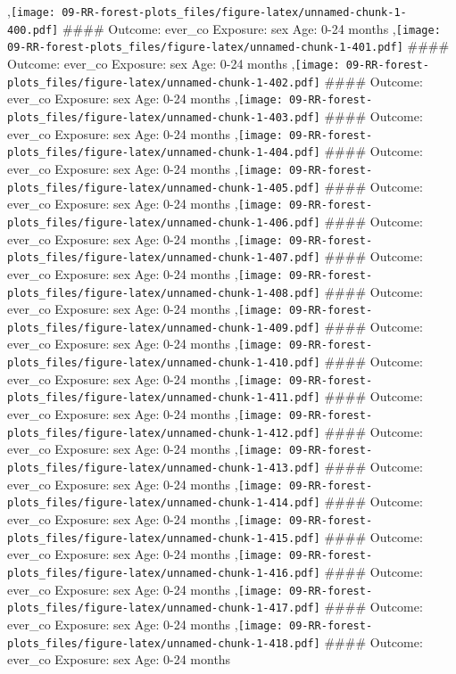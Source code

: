 \documentclass[
  9pt,
]{book}
\begin{document}
,\texttt{[image: 09-RR-forest-plots\_files/figure-latex/unnamed-chunk-1-400.pdf]}
\#\#\#\# Outcome: ever\_co Exposure: sex Age: 0-24 months
,\texttt{[image: 09-RR-forest-plots\_files/figure-latex/unnamed-chunk-1-401.pdf]}
\#\#\#\# Outcome: ever\_co Exposure: sex Age: 0-24 months
,\texttt{[image: 09-RR-forest-plots\_files/figure-latex/unnamed-chunk-1-402.pdf]}
\#\#\#\# Outcome: ever\_co Exposure: sex Age: 0-24 months
,\texttt{[image: 09-RR-forest-plots\_files/figure-latex/unnamed-chunk-1-403.pdf]}
\#\#\#\# Outcome: ever\_co Exposure: sex Age: 0-24 months
,\texttt{[image: 09-RR-forest-plots\_files/figure-latex/unnamed-chunk-1-404.pdf]}
\#\#\#\# Outcome: ever\_co Exposure: sex Age: 0-24 months
,\texttt{[image: 09-RR-forest-plots\_files/figure-latex/unnamed-chunk-1-405.pdf]}
\#\#\#\# Outcome: ever\_co Exposure: sex Age: 0-24 months
,\texttt{[image: 09-RR-forest-plots\_files/figure-latex/unnamed-chunk-1-406.pdf]}
\#\#\#\# Outcome: ever\_co Exposure: sex Age: 0-24 months
,\texttt{[image: 09-RR-forest-plots\_files/figure-latex/unnamed-chunk-1-407.pdf]}
\#\#\#\# Outcome: ever\_co Exposure: sex Age: 0-24 months
,\texttt{[image: 09-RR-forest-plots\_files/figure-latex/unnamed-chunk-1-408.pdf]}
\#\#\#\# Outcome: ever\_co Exposure: sex Age: 0-24 months
,\texttt{[image: 09-RR-forest-plots\_files/figure-latex/unnamed-chunk-1-409.pdf]}
\#\#\#\# Outcome: ever\_co Exposure: sex Age: 0-24 months
,\texttt{[image: 09-RR-forest-plots\_files/figure-latex/unnamed-chunk-1-410.pdf]}
\#\#\#\# Outcome: ever\_co Exposure: sex Age: 0-24 months
,\texttt{[image: 09-RR-forest-plots\_files/figure-latex/unnamed-chunk-1-411.pdf]}
\#\#\#\# Outcome: ever\_co Exposure: sex Age: 0-24 months
,\texttt{[image: 09-RR-forest-plots\_files/figure-latex/unnamed-chunk-1-412.pdf]}
\#\#\#\# Outcome: ever\_co Exposure: sex Age: 0-24 months
,\texttt{[image: 09-RR-forest-plots\_files/figure-latex/unnamed-chunk-1-413.pdf]}
\#\#\#\# Outcome: ever\_co Exposure: sex Age: 0-24 months
,\texttt{[image: 09-RR-forest-plots\_files/figure-latex/unnamed-chunk-1-414.pdf]}
\#\#\#\# Outcome: ever\_co Exposure: sex Age: 0-24 months
,\texttt{[image: 09-RR-forest-plots\_files/figure-latex/unnamed-chunk-1-415.pdf]}
\#\#\#\# Outcome: ever\_co Exposure: sex Age: 0-24 months
,\texttt{[image: 09-RR-forest-plots\_files/figure-latex/unnamed-chunk-1-416.pdf]}
\#\#\#\# Outcome: ever\_co Exposure: sex Age: 0-24 months
,\texttt{[image: 09-RR-forest-plots\_files/figure-latex/unnamed-chunk-1-417.pdf]}
\#\#\#\# Outcome: ever\_co Exposure: sex Age: 0-24 months
,\texttt{[image: 09-RR-forest-plots\_files/figure-latex/unnamed-chunk-1-418.pdf]}
\#\#\#\# Outcome: ever\_co Exposure: sex Age: 0-24 months
\end{document}
